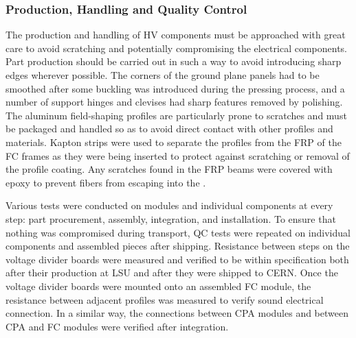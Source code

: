 \subsubsection{Production, Handling and Quality Control}
\label{sec:fdsp-hv-protodune-lessons-assy}

The production and handling of HV components must be approached with %
great care to avoid scratching and potentially compromising the electrical components. %
Part production should be carried out in such a way to avoid introducing sharp edges wherever possible.
The corners of the ground plane panels had to be smoothed after some buckling was introduced during the pressing process, and a number of support hinges and clevises had sharp features removed by polishing.
The aluminum field-shaping profiles are particularly prone to scratches and must be packaged and handled so as to avoid direct contact with other profiles and materials.
Kapton strips were used to separate the profiles from the FRP of the FC frames as they were being inserted to protect against scratching or removal of the profile coating.
Any scratches found in the FRP beams were covered with epoxy to prevent fibers from escaping into the .

Various  tests were conducted on  modules and individual components at every step: %
part procurement, assembly, integration, and installation.
To ensure that nothing was compromised during transport, QC tests were repeated on individual components and assembled pieces after shipping. 
Resistance between steps on the voltage divider boards were measured and verified to be within specification both after their production at LSU and after they were shipped to CERN.
Once the voltage divider boards were mounted onto an assembled FC module, the resistance between adjacent profiles was measured to verify sound electrical connection.
In a similar way, the connections between CPA modules and between CPA and FC modules were verified after integration.

